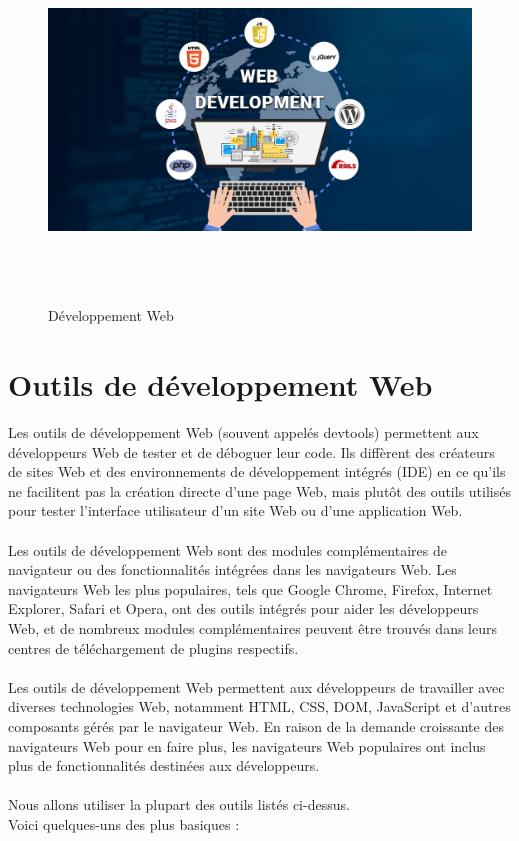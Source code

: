 \documentclass[12pt]{report}
\begin{document}
\vspace{0.6in}

\begin{figure}[h]
\centering
    \includegraphics[width = 6.6in, height = 3.8in]{../Images/webDev.jpeg}
\caption{Développement Web}
\end{figure}

\newpage

\section{Outils de développement Web}
\vspace{0.2in}
Les outils de développement Web (souvent appelés devtools) permettent aux développeurs Web de tester et de déboguer leur code. Ils diffèrent des créateurs de sites Web et des environnements de développement intégrés (IDE) en ce qu'ils ne facilitent pas la création directe d'une page Web, mais plutôt des outils utilisés pour tester l'interface utilisateur d'un site Web ou d'une application Web.
\\\\
Les outils de développement Web sont des modules complémentaires de navigateur ou des fonctionnalités intégrées dans les navigateurs Web. Les navigateurs Web les plus populaires, tels que Google Chrome, Firefox, Internet Explorer, Safari et Opera, ont des outils intégrés pour aider les développeurs Web, et de nombreux modules complémentaires peuvent être trouvés dans leurs centres de téléchargement de plugins respectifs.
\\\\
Les outils de développement Web permettent aux développeurs de travailler avec diverses technologies Web, notamment HTML, CSS, DOM, JavaScript et d'autres composants gérés par le navigateur Web. En raison de la demande croissante des navigateurs Web pour en faire plus, les navigateurs Web populaires ont inclus plus de fonctionnalités destinées aux développeurs.
\\\\
Nous allons utiliser la plupart des outils listés ci-dessus.
\\
Voici quelques-uns des plus basiques :
\end{document}
